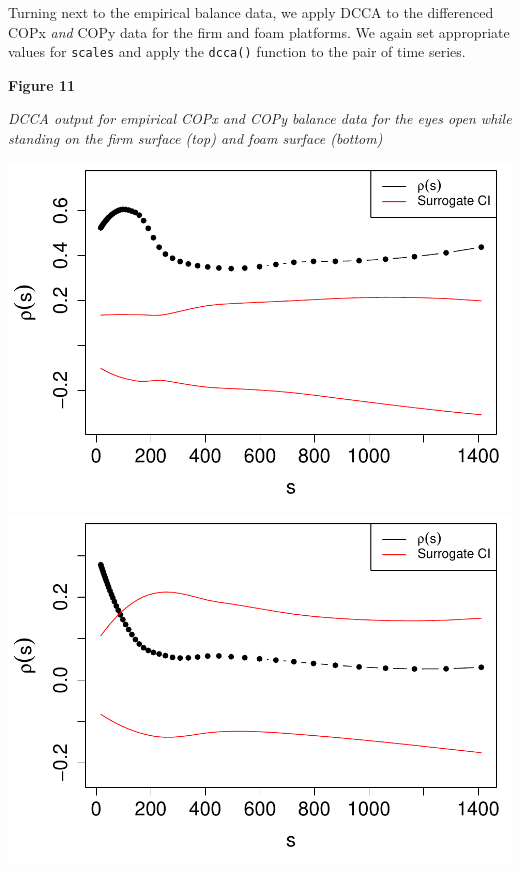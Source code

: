 \documentclass[
  man]{apa6}
\begin{document}
Turning next to the empirical balance data, we apply DCCA to the
differenced COPx \emph{and} COPy data for the firm and foam platforms. We
again set appropriate values for \texttt{scales} and apply the \texttt{dcca()}
function to the pair of time series.

\textbf{Figure 11}

\emph{DCCA output for empirical COPx and COPy balance data for the eyes open
while standing on the firm surface (top) and foam surface (bottom)}

\includegraphics{fractal_regression_paper_brm_files/figure-latex/unnamed-chunk-22-1.pdf} \includegraphics{fractal_regression_paper_brm_files/figure-latex/unnamed-chunk-22-2.pdf}
\end{document}
